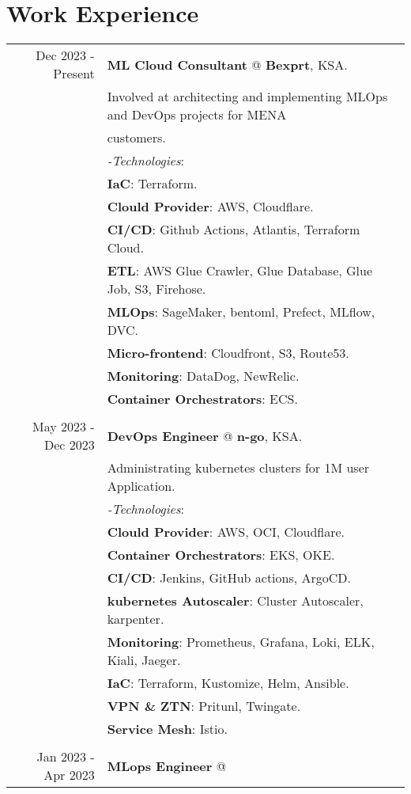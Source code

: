 \documentclass[a4paper,10pt]{article}
\begin{document}
\section{\textbf{Work Experience}}
\begin{tabular}{r|l}
    Dec 2023 - Present& \textbf{ML Cloud Consultant} @
    \textbf{Bexprt}, KSA. \\&
    Involved at architecting and implementing MLOps and DevOps projects for MENA \\& customers. \\&
    \textit{-Technologies}:\\&
    \textbf{IaC}: Terraform. \\&
    \textbf{Clould Provider}: AWS, Cloudflare. \\&
    \textbf{CI/CD}: Github Actions, Atlantis, Terraform Cloud. \\&
    \textbf{ETL}: AWS Glue Crawler, Glue Database, Glue Job, S3, Firehose. \\&
    \textbf{MLOps}: SageMaker, bentoml, Prefect, MLflow, DVC. \\&
    \textbf{Micro-frontend}: Cloudfront, S3, Route53. \\&
    \textbf{Monitoring}: DataDog, NewRelic. \\&
    \textbf{Container Orchestrators}: ECS. \\&
    \\
    May 2023 - Dec 2023 & \textbf{DevOps Engineer} @
    \textbf{n-go}, KSA. \\&
    Administrating kubernetes clusters for 1M user Application. \\&
    \textit{-Technologies}:\\&
    \textbf{Clould Provider}: AWS, OCI, Cloudflare. \\&
    \textbf{Container Orchestrators}: EKS, OKE. \\&
    \textbf{CI/CD}: Jenkins, GitHub actions, ArgoCD. \\&
    \textbf{kubernetes Autoscaler}: Cluster Autoscaler, karpenter. \\&
    \textbf{Monitoring}: Prometheus, Grafana, Loki, ELK, Kiali, Jaeger. \\&
    \textbf{IaC}: Terraform, Kustomize, Helm, Ansible.\\&
    \textbf{VPN \& ZTN}: Pritunl, Twingate. \\&
    \textbf{Service Mesh}: Istio. \\&
    \\
    Jan 2023 - Apr 2023 & \textbf{MLops Engineer} @

\end{tabular}
\end{document}
